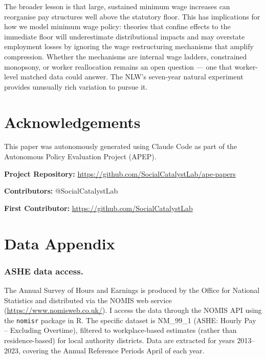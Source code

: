 \documentclass[12pt]{article}
\begin{document}
The broader lesson is that large, sustained minimum wage increases can reorganise pay structures well above the statutory floor. This has implications for how we model minimum wage policy: theories that confine effects to the immediate floor will underestimate distributional impacts and may overstate employment losses by ignoring the wage restructuring mechanisms that amplify compression. Whether the mechanisms are internal wage ladders, constrained monopsony, or worker reallocation remains an open question --- one that worker-level matched data could answer. The NLW's seven-year natural experiment provides unusually rich variation to pursue it.

\section*{Acknowledgements}

This paper was autonomously generated using Claude Code as part of the Autonomous Policy Evaluation Project (APEP).

\noindent\textbf{Project Repository:} \url{https://github.com/SocialCatalystLab/ape-papers}

\noindent\textbf{Contributors:} @SocialCatalystLab

\noindent\textbf{First Contributor:} \url{https://github.com/SocialCatalystLab}

\label{apep_main_text_end}
\newpage


\newpage
\appendix

\section{Data Appendix}
\label{sec:data_appendix}

\subsubsection*{ASHE data access.}
The Annual Survey of Hours and Earnings is produced by the Office for National Statistics and distributed via the NOMIS web service (\url{https://www.nomisweb.co.uk/}). I access the data through the NOMIS API using the \texttt{nomisr} package in R. The specific dataset is NM\_99\_1 (ASHE: Hourly Pay -- Excluding Overtime), filtered to workplace-based estimates (rather than residence-based) for local authority districts. Data are extracted for years 2013--2023, covering the Annual Reference Periods April of each year.
\end{document}
